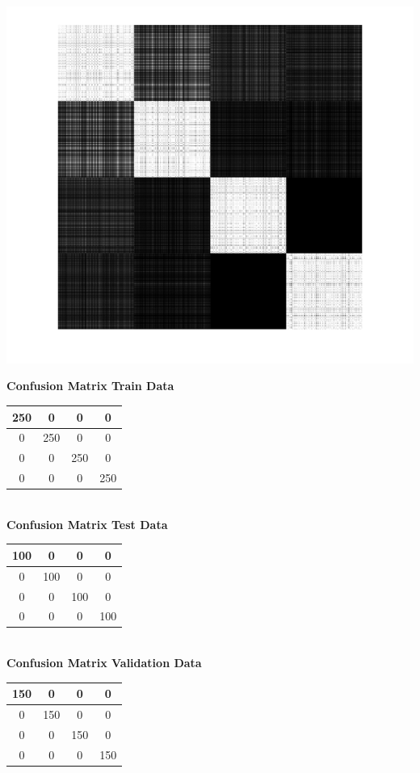 \documentclass{article}
\begin{document}
\begin{center}
\includegraphics[scale=1]{Classification/1a/c_g/kgm}
\end{center}
\begin{flushleft}
\textbf{Confusion Matrix Train Data\\[5pt]}
\begin{tabular}{|c|c|c|c|}
\hline
250 & 0 & 0 & 0 \\
\hline
0 & 250 & 0 & 0 \\
\hline
0 & 0 & 250 & 0 \\
\hline
0 & 0 & 0 & 250 \\
\hline
\end{tabular}
\textbf{\\[10pt] Confusion Matrix Test Data \\[5pt]}
\begin{tabular}{|c|c|c|c|}
\hline
100 & 0 & 0 & 0 \\
\hline
0 & 100 & 0 & 0 \\
\hline
0 & 0 & 100 & 0 \\
\hline
0 & 0 & 0 & 100 \\
\hline
\end{tabular}
\textbf{\\[10pt] Confusion Matrix Validation Data \\[5pt]}
\begin{tabular}{|c|c|c|c|}
\hline
150 & 0 & 0 & 0 \\
\hline
0 & 150 & 0 & 0 \\
\hline
0 & 0 & 150 & 0 \\
\hline
0 & 0 & 0 & 150 \\
\hline
\end{tabular}
\end{flushleft}
\end{document}
